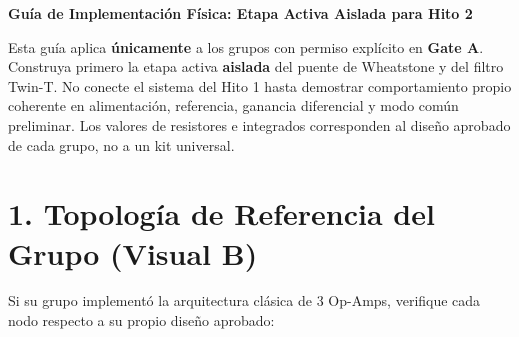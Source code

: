 \documentclass[11pt, a4paper]{article}
\begin{document}
\begin{center}
    \Large\textbf{\textcolor{ucbblue}{Guía de Implementación Física: Etapa Activa Aislada para Hito 2}}
\end{center}

\begin{tcolorbox}[colback=red!5, colframe=red!70!black, title=\textbf{Regla de Aislamiento Pre-Integración}]
    \raggedright
    Esta guía aplica \textbf{únicamente} a los grupos con permiso explícito en \textbf{Gate A}. Construya primero la etapa activa \textbf{aislada} del puente de Wheatstone y del filtro Twin-T. No conecte el sistema del Hito 1 hasta demostrar comportamiento propio coherente en alimentación, referencia, ganancia diferencial y modo común preliminar. Los valores de resistores e integrados corresponden al diseño aprobado de cada grupo, no a un kit universal.
\end{tcolorbox}

\section*{1. Topología de Referencia del Grupo (Visual B)}
Si su grupo implementó la arquitectura clásica de 3 Op-Amps, verifique cada nodo respecto a su propio diseño aprobado:
\end{document}

